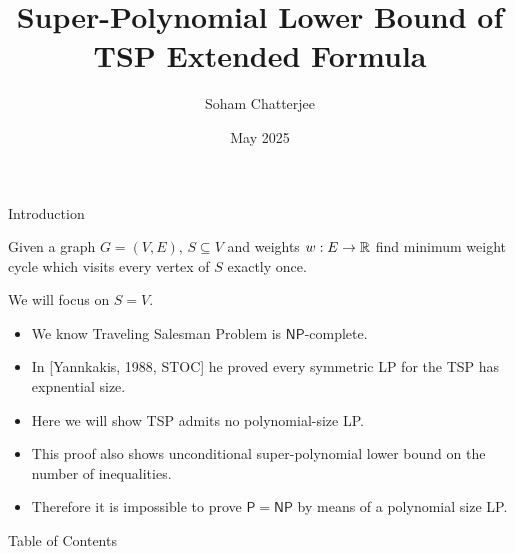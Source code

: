 \documentclass[aspectratio=1610, handout]{beamer}
\title{Super-Polynomial Lower Bound of TSP Extended Formula}
\date{May 2025}
\author{Soham Chatterjee}
\renewcommand{\P}{\ensuremath{\mathsf{P}}}
\newcommand{\NP}{\ensuremath{\mathsf{NP}}}
\begin{document}
\begin{frame}
	\titlepage
\end{frame}



\begin{frame}{Introduction}
	\begin{definition}
		Given a graph $G=(V,E)$, $S\subseteq V$ and weights $w:E\to \mathbb{R}$ find minimum weight cycle which visits every vertex of $S$ exactly once.
	\end{definition}\pause

	We will focus on $S=V$.
	\begin{itemize}
		\item We know Traveling Salesman Problem is $\NP$-complete.
		\item In [Yannkakis, 1988, STOC] he proved every symmetric LP for the TSP has expnential size.
		\item Here we will show TSP admits no polynomial-size LP.
		\item This proof also shows unconditional super-polynomial lower bound on the number of inequalities.
		\item Therefore it is impossible to prove $\P=\NP$ by means of a polynomial size LP.
	\end{itemize}
\end{frame}
\begin{frame}{Table of Contents}
    \tableofcontents
\end{frame}
\end{document}
